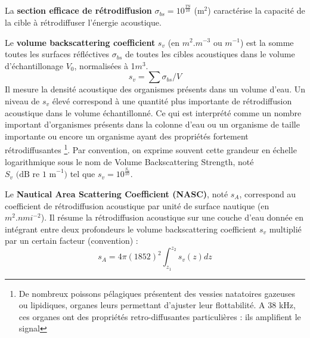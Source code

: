 	 \vspace{0.5cm}
	 
	 La \textbf{section efficace de rétrodiffusion} \(\sigma_{bs} = 10^{\frac{TS}{10}}\)  (\(\mathrm{m^2}\)) caractérise la capacité de la cible à rétrodiffuser l'énergie acoustique. 
	 
	 \vspace{0.5cm}
	 
	 Le \textbf{volume backscattering coefficient} $s_v$ (en $m^{2}.m^{-3}$ ou $m^{-1}$) est la somme  toutes les surfaces réfléctives $\sigma_{bs}$ de toutes les cibles acoustiques dans le volume d'échantillonage $V_0$, normalisées à 1$m^{3}$.  
	 \begin{equation}
	 	s_v = \sum \sigma_{bs}/V
	 \end{equation}
	 Il mesure la densité acoustique des organismes présents dans un volume d'eau. Un niveau de $s_v$ élevé correspond à une quantité plus importante de rétrodiffusion acoustique dans le volume échantillonné. Ce qui est interprété comme un nombre important d'organismes présents dans la colonne d'eau ou un organisme de taille importante ou encore un organisme ayant des propriétés fortement rétrodiffusantes \footnote{De nombreux poissons pélagiques présentent des vessies natatoires gazeuses ou lipidiques, organes leurs permettant d'ajuster leur flottabilité. A 38 kHz, ces organes ont des propriétés retro-diffusantes particulières : ils amplifient le signal}. Par convention, on exprime souvent cette grandeur en échelle logarithmique sous le nom de Volume Backscattering Strength, noté $S_v \text{ (dB re 1 m}^{-1})$ tel que $s_v = 10^{\frac {S_v} {10}}$.
	 
	 \vspace{0.5cm}
	 
	 Le \textbf{Nautical Area Scattering Coefficient (NASC)}, noté $s_A$, correspond au coefficient de rétrodiffusion acoustique par unité de surface nautique (en $m^{2}.nmi^{-2}$). Il résume la rétrodiffusion acoustique sur une couche d'eau donnée en intégrant entre deux profondeurs le volume backscattering coefficient $s_v$ multiplié par un certain facteur (convention) :
	 \begin{equation}
	 	s_A = 4 \pi (1852)^{2} \int_{z_{1}}^{z_{2}} s_v(z) dz
	 \end{equation}
	 
